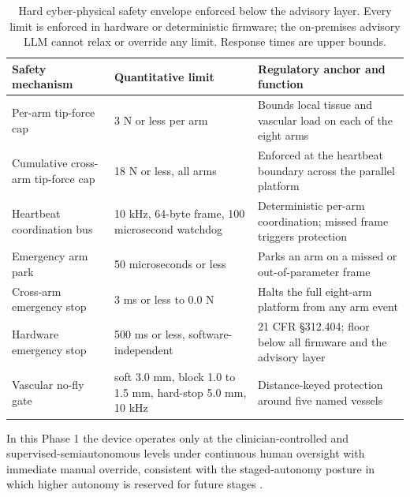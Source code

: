 \begin{table}[t]
\caption{Hard cyber-physical safety envelope enforced below the advisory layer.
Every limit is enforced in hardware or deterministic firmware; the on-premises
advisory LLM cannot relax or override any limit. Response times are upper bounds.}
\label{tab:sec02-envelope}
\centering
\begin{tabularx}{\textwidth}{L{4.8cm} L{3.6cm} Y}
\toprule
\textbf{Safety mechanism} & \textbf{Quantitative limit} & \textbf{Regulatory anchor and function} \\
\midrule
Per-arm tip-force cap & 3 N or less per arm & Bounds local tissue and vascular load on each of the eight arms \\
Cumulative cross-arm tip-force cap & 18 N or less, all arms & Enforced at the heartbeat boundary across the parallel platform \\
Heartbeat coordination bus & 10 kHz, 64-byte frame, 100 microsecond watchdog & Deterministic per-arm coordination; missed frame triggers protection \\
Emergency arm park & 50 microseconds or less & Parks an arm on a missed or out-of-parameter frame \\
Cross-arm emergency stop & 3 ms or less to 0.0 N & Halts the full eight-arm platform from any arm event \\
Hardware emergency stop & 500 ms or less, software-independent & 21 CFR \S 312.404; floor below all firmware and the advisory layer \\
Vascular no-fly gate & soft 3.0 mm, block 1.0 to 1.5 mm, hard-stop 5.0 mm, 10 kHz & Distance-keyed protection around five named vessels \\
\bottomrule
\end{tabularx}
\end{table}
\vspace*{-1.4cm}

In this Phase 1 the device
operates only at the clinician-controlled and supervised-semiautonomous levels under
continuous human oversight with immediate manual override, consistent with the
staged-autonomy posture in which higher autonomy is reserved for future stages
\cite{daraxwhipple, onpremwhippl, clintrustpai}.

